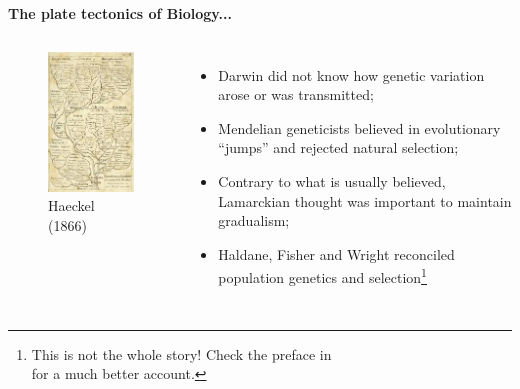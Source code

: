 \begin{frame}[t]{\textbf{The plate tectonics of Biology...}}
\begin{columns}[c]
\column{2.5in}
\begin{figure}[!h]
\begin{center}
\includegraphics[scale=.55]{FIGURES/haeckel_tree_1866.jpg}
\caption{Haeckel (1866)}
\end{center}
\end{figure}
\column{2.5in}
\begin{itemize}
\item Darwin did not know how genetic variation arose or was transmitted;
\item Mendelian geneticists believed in evolutionary ``jumps'' and rejected natural selection;
\item Contrary to what is usually believed, Lamarckian thought was important to maintain gradualism;
\item[\tikzmark{bl}\textbullet] Haldane, Fisher and Wright reconciled population genetics and selection\footnote[1]{\tiny This is not the whole story!
Check the preface in~\cite{mayr1998}\\ for a much better account.}
\end{itemize}
\end{columns}
\end{frame}
